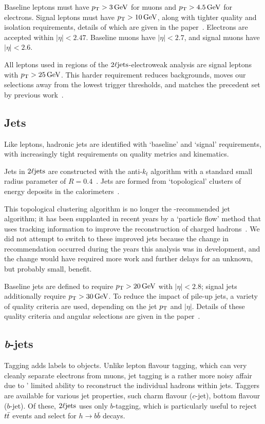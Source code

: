 Baseline leptons must have $\pt > 3\,\eV[G]$ for muons and
$\pt > 4.5\,\eV[G]$ for electrons.
Signal leptons must have $\pt > 10\,\eV[G]$, along with tighter
quality and isolation requirements, details of which are given in the
paper~\cite{atlas2022searches}.
Electrons are accepted within $|\eta| < 2.47$.
Baseline muons have $|\eta| < 2.7$, and signal muons have $|\eta| < 2.6$.

All leptons used in regions of the $\twoljets$-electroweak analysis are signal
leptons with $\pt > 25\,\eV[G]$.
This harder requirement reduces backgrounds, moves our selections away from the
lowest trigger thresholds, and matches the precedent set by previous
work~\cite{atlas_23l_SUSY_2016_24}.


\subsection{Jets}
Like leptons, hadronic jets are identified with `baseline' and `signal'
requirements, with increasingly tight requirements on quality metrics and
kinematics.

Jets in $\twoljets$ are constructed with the anti-$k_t$ algorithm with a
standard small radius parameter of $R=0.4$~\cite{jet_anti_kt}.
Jets are formed from `topological' clusters of energy deposits in the
calorimeters~\cite{atlas_jet_topo_PERF_2014_07}.

This topological clustering algorithm is no longer the \atlas-recommended jet
algorithm; it has been supplanted in recent years by a `particle flow' method
that uses tracking information to improve the reconstruction of charged
hadrons~\cite{atlas_jet_pflow_PERF_2015_09}.
We did not attempt to switch to these improved jets because the change in
recommendation occurred during the years this analysis was in development, and
the change would have required more work and further delays for an unknown,
but probably small, benefit.

Baseline jets are defined to require $\pt > 20\,\eV[G]$ with $|\eta| < 2.8$;
signal jets additionally require $\pt > 30\,\eV[G]$.
To reduce the impact of pile-up jets, a variety of quality criteria are used,
depending on the jet $\pt$ and $|\eta|$.
Details of these quality criteria and angular selections are given in the
paper~\cite{atlas2022searches}.


\subsection{\textit{b}-jets}
\label{sec:2ljets_btagging}
Tagging adds labels to objects.
Unlike lepton flavour tagging, which can very cleanly separate electrons from
muons, jet tagging is a rather more noisy affair due to \atlas' limited
ability to reconstruct the individual hadrons within jets.
Taggers are available for various jet properties, such charm flavour ($c$-jet),
bottom flavour ($b$-jet).
Of these, $\twoljets$ uses only $b$-tagging, which is particularly useful to
reject $\ttbar$ events and select for $h\to b\bar b$ decays.

